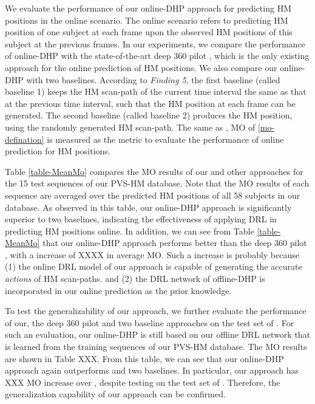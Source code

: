 \documentclass[10pt,journal,compsoc]{IEEEtran}
\begin{document}
We evaluate the performance of our online-DHP approach for predicting HM positions in the online scenario.
The online scenario refers to predicting HM position of one subject at each frame upon the observed HM positions of this subject at the previous frames.
In our experiments, we compare the performance of online-DHP with the state-of-the-art deep 360 pilot \cite{hu2017deep}, which is the only existing approach for the online prediction of HM positions.
We also compare our online-DHP with two baselines. According to \textit{Finding 5}, the first baseline (called baseline 1) keeps the HM scan-path of the current time interval the same as that at the previous time interval, such that the HM position at each frame can be generated.
The second baseline (called baseline 2) produces the HM position, using the randomly generated HM scan-path. The same as \cite{hu2017deep}, MO of \eqref{mo-defination} is measured as the metric to evaluate the performance of online prediction for HM positions.

Table \ref{table-MeanMo} compares the MO results of our and other approaches for the 15 test sequences of our PVS-HM database. Note that the MO results of each sequence are averaged over the predicted HM positions of all 58 subjects in our database. As observed in this table, our online-DHP approach is significantly superior to two baselines, indicating the effectiveness of applying DRL in predicting HM positions online.
In addition, we can see from Table \ref{table-MeanMo} that our online-DHP approach performs better than the deep 360 pilot \cite{hu2017deep}, with a increase of XXXX in average MO. Such a increase is probably because (1) the online DRL model of our approach is capable of generating the accurate \textit{actions} of HM scan-paths. and (2) the DRL network of offline-DHP is incorporated in our online prediction as the prior knowledge.

To test the generalizability of our approach, we further evaluate the performance of our, the deep 360 pilot \cite{hu2017deep} and two baseline approaches on the test set of \cite{hu2017deep}. For such an evaluation, our online-DHP is still based on our offline DRL network that is learned from the training sequences of our PVS-HM database. The MO results are shown in Table XXX. From this table, we can see that our online-DHP approach again outperforms \cite{hu2017deep} and two baselines. In particular, our approach has XXX MO increase over \cite{hu2017deep}, despite testing on the test set of \cite{hu2017deep}. Therefore, the generalization capability of our approach can be confirmed.
\end{document}
